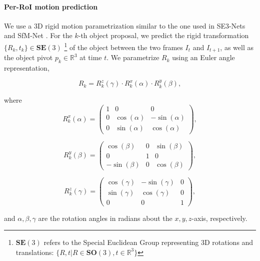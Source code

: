 \paragraph{Per-RoI motion prediction}
We use a 3D rigid motion parametrization similar to the one used in SE3-Nets and SfM-Net \cite{SE3Nets, SfmNet}.
For the $k$-th object proposal, we predict the rigid transformation $\{R_k, t_k\}\in \mathbf{SE}(3)$
\footnote{$\mathbf{SE}(3)$ refers to the Special Euclidean Group representing 3D rotations
and translations: $\{R, t|R \in \mathbf{SO}(3), t \in \mathbb{R}^3\}$}
of the object between the two frames $I_t$ and $I_{t+1}$, as well as the object pivot $p_k \in \mathbb{R}^3$ at time $t$.
We parametrize ${R_k}$ using an Euler angle representation,

\begin{equation}
R_k = R_k^z(\gamma) \cdot R_k^x(\alpha) \cdot R_k^y(\beta),
\end{equation}

where
\begin{equation}
R_k^x(\alpha) =
\begin{pmatrix}
  1 & 0 & 0 \\
  0 & \cos(\alpha) & -\sin(\alpha) \\
  0 & \sin(\alpha) & \cos(\alpha)
\end{pmatrix},
\end{equation}

\begin{equation}
R_k^y(\beta) =
\begin{pmatrix}
  \cos(\beta) & 0 & \sin(\beta) \\
  0 & 1 & 0 \\
  -\sin(\beta) & 0 & \cos(\beta)
\end{pmatrix},
\end{equation}

\begin{equation}
R_k^z(\gamma) =
\begin{pmatrix}
  \cos(\gamma) & -\sin(\gamma) & 0 \\
  \sin(\gamma) & \cos(\gamma) & 0 \\
  0 & 0 & 1
\end{pmatrix},
\end{equation}

and $\alpha, \beta, \gamma$ are the rotation angles in radians about the $x,y,z$-axis, respectively.

